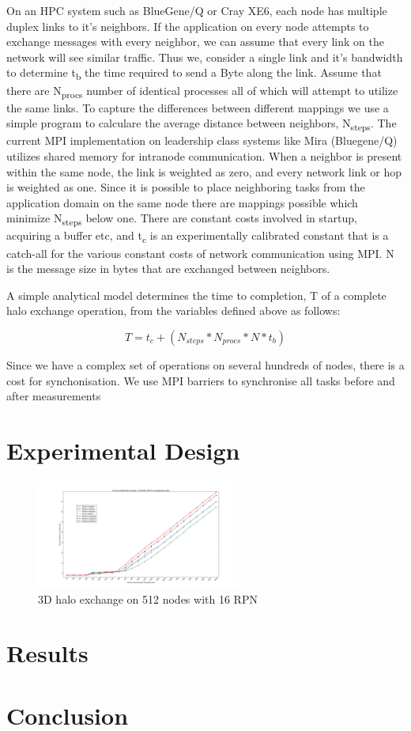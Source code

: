\documentclass[conference,10pt]{IEEEtran}
\begin{document}
On an HPC system such as BlueGene/Q or Cray XE6, each node has multiple duplex links to it's neighbors.
If the application on every node attempts to exchange messages with every neighbor, we can assume that
every link on the network will see similar traffic. Thus we, consider a single link and it's bandwidth
to determine t\textsubscript{b} the time required to send a Byte along the link. Assume that there are N\textsubscript{procs} number
of identical processes all of which will attempt to utilize the same links. To capture the differences
between different mappings we use a simple program to calculare the average distance between neighbors,
N\textsubscript{steps}. The current MPI implementation on leadership class systems like Mira (Bluegene/Q) utilizes
shared memory for intranode communication. When a neighbor is present within the same node, the link
is weighted as zero, and every network link or hop is weighted as one. Since it is possible to place
neighboring tasks from the application domain on the same node there are mappings possible which
minimize N\textsubscript{steps} below one. There are constant costs involved in startup, acquiring a buffer etc,
and t\textsubscript{c} is an experimentally calibrated constant that is a catch-all for the various constant costs
of network communication using MPI. N is the message size in bytes that are exchanged between neighbors.

A simple analytical model determines the time to completion, T of a complete halo exchange operation,
from the variables defined above as follows:

\begin{equation}
  T = t_c + (N_{steps} * N_{procs} * N * t_b)
\end{equation}

Since we have a complex set of operations on several hundreds of nodes, there is a cost for synchonisation.
We use MPI barriers to synchronise all tasks before and after measurements

\section{Experimental Design}

\label{sect:3D Halo plot}
\begin{figure}
  \center
  \includegraphics[width=0.6\textwidth]{3D_512_all_mappings.png}
  \caption{3D halo exchange on 512 nodes with 16 RPN}
    \label{fig:3D halo exchange on 512 nodes with 16 RPN}
\end{figure}


\section{Results}

\section{Conclusion}




\end{document}
